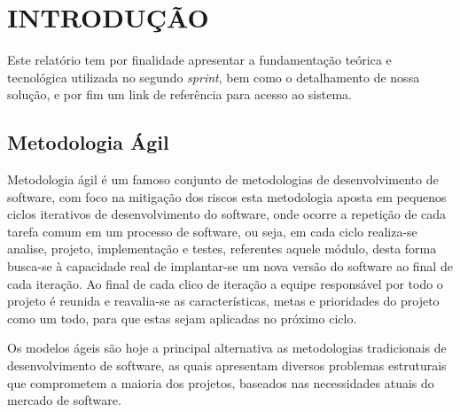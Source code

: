 \documentclass{abnt}
\begin{document}





\capa

\folhaderosto

\tableofcontents

\listoffigures


\chapter{INTRODUÇÃO}

	Este relatório tem por finalidade apresentar a fundamentação teórica e tecnológica utilizada no segundo \emph{sprint}, bem como o detalhamento de nossa solução, e por fim um link de referência para acesso ao sistema.


	
	\section{Metodologia Ágil}
	
		Metodologia ágil é um famoso conjunto de metodologias de desenvolvimento de software, 
		com foco na mitigação dos riscos esta metodologia aposta em pequenos ciclos iterativos de desenvolvimento do software,
		onde ocorre a repetição de cada tarefa comum em um processo de software, ou seja, em cada ciclo realiza-se analise, projeto,
		implementação e testes, referentes aquele módulo, desta forma busca-se à capacidade real de implantar-se um nova versão 
		do software ao final de cada iteração. Ao final de cada clico de iteração a equipe responsável por todo o projeto é reunida 
		e reavalia-se as características, metas e prioridades do projeto como um todo, para que estas sejam aplicadas no próximo ciclo.
		
		Os modelos ágeis são hoje a principal alternativa as metodologias tradicionais de desenvolvimento de software, 
		as quais apresentam diversos problemas estruturais que comprometem a maioria dos projetos, 
		baseados nas necessidades atuais do mercado de software.
	
\end{document}
